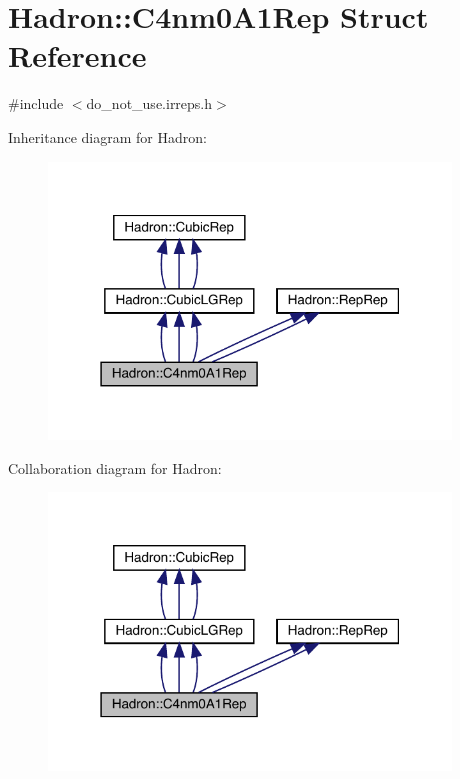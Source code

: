 \hypertarget{structHadron_1_1C4nm0A1Rep}{}\section{Hadron\+:\+:C4nm0\+A1\+Rep Struct Reference}
\label{structHadron_1_1C4nm0A1Rep}


{\ttfamily \#include $<$do\+\_\+not\+\_\+use.\+irreps.\+h$>$}



Inheritance diagram for Hadron\+:
\nopagebreak
\begin{figure}[H]
\begin{center}
\leavevmode
\includegraphics[width=303pt]{da/d93/structHadron_1_1C4nm0A1Rep__inherit__graph}
\end{center}
\end{figure}


Collaboration diagram for Hadron\+:
\nopagebreak
\begin{figure}[H]
\begin{center}
\leavevmode
\includegraphics[width=303pt]{d4/d40/structHadron_1_1C4nm0A1Rep__coll__graph}
\end{center}
\end{figure}
